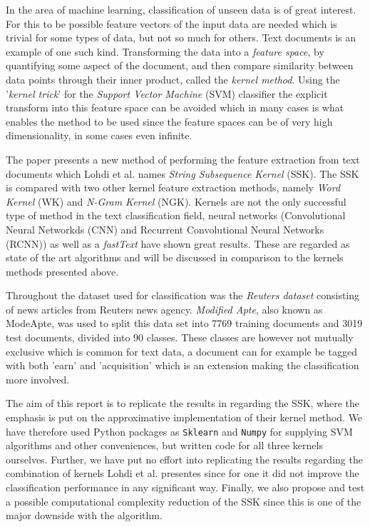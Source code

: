 
In the area of machine learning, classification of unseen data is of great interest. For this to be possible feature vectors of the input data are needed which is trivial for some types of data, but not so much for others. Text documents is an example of one such kind. Transforming the data into a \textit{feature space}, by quantifying some aspect of the document, and then compare similarity between data points through their inner product, called the \textit{kernel method}. Using the '\textit{kernel trick}' for the \textit{Support Vector Machine} (SVM) classifier the explicit transform into this feature space can be avoided which in many cases is what enables the method to be used since the feature spaces can be of very high dimensionality, in some cases even infinite.

The paper \cite{lodhi} presents a new method of performing the feature extraction from text documents which Lohdi et al. names \textit{String Subsequence Kernel} (SSK). The SSK is compared with two other kernel feature extraction methods, namely \textit{Word Kernel} (WK) and \textit{N-Gram Kernel} (NGK). Kernels are not the only successful type of method in the text classification field, neural networks (Convolutional Neural Networkds (CNN) and Recurrent Convolutional Neural Networks (RCNN)) as well as a \textit{fastText} \cite{joulin2016bag} have shown great results. These are regarded as state of the art algorithms and will be discussed in comparison to the kernels methods presented above. 

Throughout \cite{lodhi} the dataset used for classification was the \textit{Reuters dataset} consisting of news articles from Reuters news agency. \textit{Modified Apte}, also known as ModeApte, was used to split this data set into 7769 training documents and 3019 test documents, divided into 90 classes. These classes are however not mutually exclusive which is common for text data, a document can for example be tagged with both 'earn' and 'acquisition' which is an extension making the classification more involved.

The aim of this report is to replicate the results in \cite{lodhi} regarding the SSK, where the emphasis is put on the approximative implementation of their kernel method. We have therefore used Python packages as \texttt{Sklearn} and \texttt{Numpy} for supplying SVM algorithms and other conveniences, but written code for all three kernels ourselves. Further, we have put no effort into replicating the results regarding the combination of kernels Lohdi et al. presentes since for one it did not improve the classification performance in any significant way. Finally, we also propose and test a possible computational complexity reduction of the SSK since this is one of the major downside with the algorithm.

